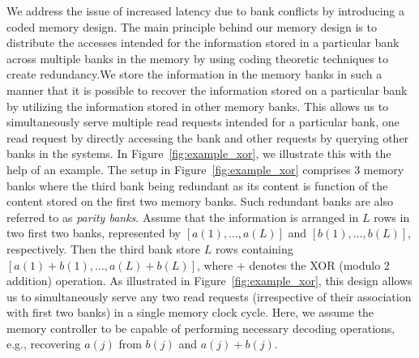 We address the issue of increased latency due to bank conflicts by introducing a coded memory design. The main principle behind our memory design is to distribute the accesses intended for the information stored in a particular bank across multiple banks in the memory by using coding theoretic techniques to create redundancy.We store the information in the memory banks in such a manner that it is possible to recover the information stored on a particular bank by utilizing the information stored in other memory banks. This allows us to simultaneously serve multiple read requests intended for a particular bank, one read request by directly accessing the bank and other requests by querying other banks in the systems. In Figure~\ref{fig:example_xor}, we illustrate this with the help of an example. The setup in Figure~\ref{fig:example_xor} comprises $3$ memory banks where the third bank being redundant as its content is function of the content stored on the first two memory banks. Such redundant banks are also referred to as {\em parity banks}. Assume that the information is arranged in $L$ rows in two first two banks, represented by $[a(1),\ldots, a(L)]$ and $[b(1),\ldots, b(L)]$, respectively. Then the third bank store $L$ rows containing $[a(1) + b(1),\ldots, a(L) + b(L)]$, where $+$ denotes the XOR (modulo $2$ addition) operation. As illustrated in Figure~\ref{fig:example_xor}, this design allows us to simultaneously serve any two read requests (irrespective of their association with first two banks) in a single memory clock cycle. Here, we assume the memory controller to be capable of performing necessary decoding operations, e.g., recovering $a(j)$ from $b(j)$ and $a(j) + b(j)$.

